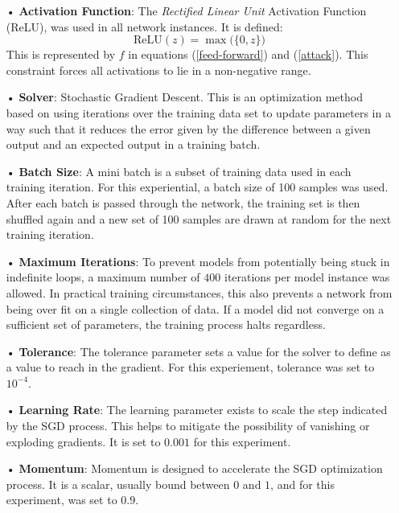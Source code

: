 \documentclass[12pt,letterpaper]{article}
\begin{document}
\begin{itemize}

\item[•]\textbf{Activation Function}: The \textit{Rectified Linear Unit} Activation Function (ReLU), was used in all network instances. It is defined:
\begin{equation}
\label{ReLU}
\text{ReLU}(z) = \max \big( \{0,z\} \big)
\end{equation}
This is represented by $f$ in equations (\ref{feed-forward}) and (\ref{attack}). This constraint forces all activations to lie in a non-negative range.

\item[•]\textbf{Solver}: Stochastic Gradient Descent. This is an optimization method based on using iterations over the training data set to update parameters in a way such that it reduces the error given by the difference between a given output and an expected output in a training batch.

\item[•]\textbf{Batch Size}: A mini batch is a subset of training data used in each training iteration. For this experiential, a batch size of 100 samples was used. After each batch is passed through the network, the training set is then shuffled again and a new set of 100 samples are drawn at random for the next training iteration.

\item[•]\textbf{Maximum Iterations}: To prevent models from potentially being stuck in indefinite loops, a maximum number of $400$ iterations per model instance was allowed. In practical training circumstances, this also prevents a network from being over fit on a single collection of data. If a model did not converge on a sufficient set of parameters, the training process halts regardless.

\item[•]\textbf{Tolerance}: The tolerance parameter sets a value for the solver to define as a value to reach in the gradient. For this experiement, tolerance was set to $10^{-4}$.

\item[•]\textbf{Learning Rate}: The learning parameter exists to scale the step indicated by the SGD process. This helps to mitigate the possibility of vanishing or exploding gradients. It is set to $0.001$ for this experiment. 

\item[•]\textbf{Momentum}: Momentum is designed to accelerate the SGD optimization process. It is a scalar, usually bound between $0$ and $1$, and for this experiment, was set to $0.9$.

\end{itemize}
\end{document}
